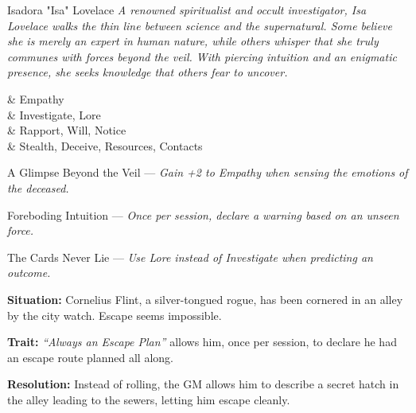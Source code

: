 \begin{WyrdNPC}[float=!b]{Isadora "Isa" Lovelace}
	\emph{A renowned spiritualist and occult investigator, Isa Lovelace walks the thin line between science and the supernatural. Some believe she is merely an expert in human nature, while others whisper that she truly communes with forces beyond the veil. With piercing intuition and an enigmatic presence, she seeks knowledge that others fear to uncover.}
  
	\vspace{0.5\baselineskip}

	\begin{SkillsBox}
		\Expert & Empathy \\
		\Skilled & Investigate, Lore \\
		\Novice & Rapport, Will, Notice \\
		\Untrained & Stealth, Deceive, Resources, Contacts \\
	\end{SkillsBox}
  
	\begin{TraitsBox}
	  \item[A Glimpse Beyond the Veil] — \emph{Gain +2 to Empathy when sensing the emotions of the deceased.}
	  \item[Foreboding Intuition] — \emph{Once per session, declare a warning based on an unseen force.}
	  \item[The Cards Never Lie] — \emph{Use Lore instead of Investigate when predicting an outcome.}
	\end{TraitsBox}
  \end{WyrdNPC}
  

\begin{WyrdExample}
	\textbf{Situation:} Cornelius Flint, a silver-tongued rogue, has been cornered in an alley by the city watch. Escape seems impossible.

	\noindent\textbf{Trait:} \emph{“Always an Escape Plan”} allows him, once per session, to declare he had an escape route planned all along.

	\noindent\textbf{Resolution:} Instead of rolling, the GM allows him to describe a secret hatch in the alley leading to the sewers, letting him escape cleanly.
\end{WyrdExample}
 
